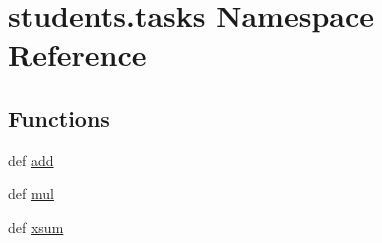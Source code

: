 \hypertarget{namespacestudents_1_1tasks}{\section{students.\-tasks Namespace Reference}
\label{namespacestudents_1_1tasks}
}
\subsection*{Functions}
\begin{DoxyCompactItemize}
\item 
def \hyperlink{namespacestudents_1_1tasks_ad6eac1d265bd032ad194a05529922634}{add}
\item 
def \hyperlink{namespacestudents_1_1tasks_a450c9bee6f3154447de9637ef1ee3305}{mul}
\item 
def \hyperlink{namespacestudents_1_1tasks_ad38617c8d05d606dffb9a4f1aa083d44}{xsum}
\end{DoxyCompactItemize}


